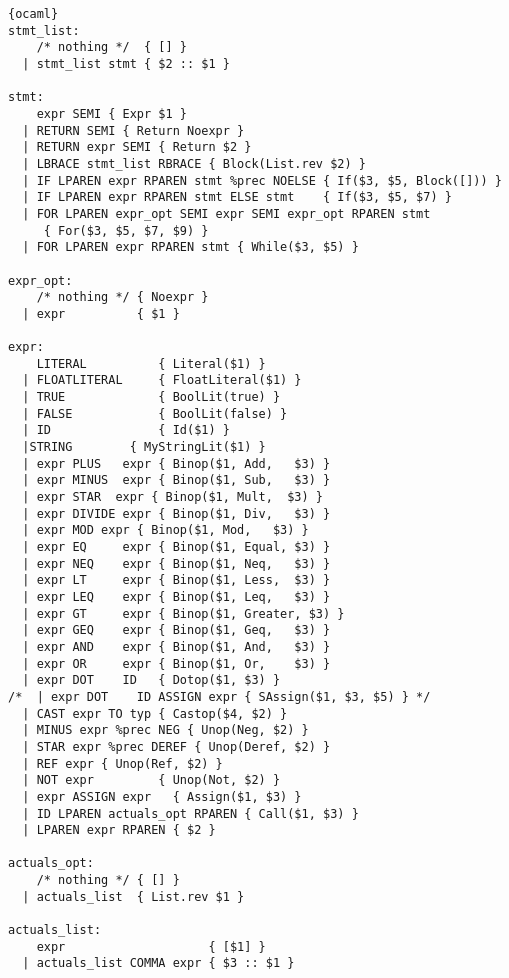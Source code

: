 \begin{lstlisting}{ocaml}
stmt_list:
    /* nothing */  { [] }
  | stmt_list stmt { $2 :: $1 }

stmt:
    expr SEMI { Expr $1 }
  | RETURN SEMI { Return Noexpr }
  | RETURN expr SEMI { Return $2 }
  | LBRACE stmt_list RBRACE { Block(List.rev $2) }
  | IF LPAREN expr RPAREN stmt %prec NOELSE { If($3, $5, Block([])) }
  | IF LPAREN expr RPAREN stmt ELSE stmt    { If($3, $5, $7) }
  | FOR LPAREN expr_opt SEMI expr SEMI expr_opt RPAREN stmt
     { For($3, $5, $7, $9) }
  | FOR LPAREN expr RPAREN stmt { While($3, $5) }

expr_opt:
    /* nothing */ { Noexpr }
  | expr          { $1 }

expr:
    LITERAL          { Literal($1) }
  | FLOATLITERAL     { FloatLiteral($1) }
  | TRUE             { BoolLit(true) }
  | FALSE            { BoolLit(false) }
  | ID               { Id($1) }
  |STRING	     { MyStringLit($1) } 
  | expr PLUS   expr { Binop($1, Add,   $3) }
  | expr MINUS  expr { Binop($1, Sub,   $3) }
  | expr STAR  expr { Binop($1, Mult,  $3) }
  | expr DIVIDE expr { Binop($1, Div,   $3) }
  | expr MOD expr { Binop($1, Mod,   $3) }
  | expr EQ     expr { Binop($1, Equal, $3) }
  | expr NEQ    expr { Binop($1, Neq,   $3) }
  | expr LT     expr { Binop($1, Less,  $3) }
  | expr LEQ    expr { Binop($1, Leq,   $3) }
  | expr GT     expr { Binop($1, Greater, $3) }
  | expr GEQ    expr { Binop($1, Geq,   $3) }
  | expr AND    expr { Binop($1, And,   $3) }
  | expr OR     expr { Binop($1, Or,    $3) }
  | expr DOT    ID   { Dotop($1, $3) }
/*  | expr DOT    ID ASSIGN expr { SAssign($1, $3, $5) } */
  | CAST expr TO typ { Castop($4, $2) }
  | MINUS expr %prec NEG { Unop(Neg, $2) }
  | STAR expr %prec DEREF { Unop(Deref, $2) }
  | REF expr { Unop(Ref, $2) }
  | NOT expr         { Unop(Not, $2) }
  | expr ASSIGN expr   { Assign($1, $3) }
  | ID LPAREN actuals_opt RPAREN { Call($1, $3) }
  | LPAREN expr RPAREN { $2 }

actuals_opt:
    /* nothing */ { [] }
  | actuals_list  { List.rev $1 }

actuals_list:
    expr                    { [$1] }
  | actuals_list COMMA expr { $3 :: $1 }
\end{lstlisting}
